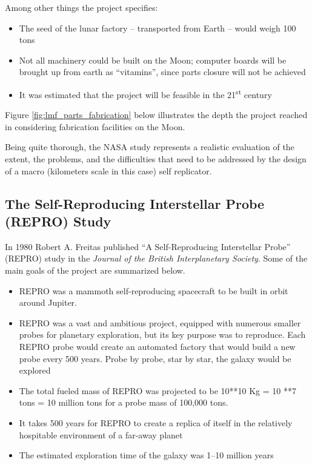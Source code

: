Among other things the project specifies:

\begin{itemize}
\item The seed of the lunar factory – transported from Earth – would
weigh 100 tons
\item Not all machinery could be built on the Moon; computer boards will
be brought up from earth as “vitamins”, since parts closure will not be
achieved
\item It was estimated that the project will be feasible in the
21\textsuperscript{st} century
\end{itemize}

Figure \ref{fig:lmf_parts_fabrication} below illustrates the depth the project reached in considering
fabrication facilities on the Moon.


Being quite thorough, the NASA study represents a realistic evaluation of
the extent, the problems, and the difficulties that need to be addressed
by the design of a macro (kilometers scale in this case) self
replicator.

\subsection[The Self{}-Reproducing Interstellar Probe (REPRO) Study]{The
Self-Reproducing Interstellar Probe (REPRO) Study}

In 1980 Robert A. Freitas
published  “A Self-Reproducing Interstellar Probe” (REPRO) study  in
the \textit{Journal of the British Interplanetary Society}. Some of the
main goals of the project are summarized below.

\begin{itemize}
\item REPRO was a mammoth self-reproducing spacecraft to be built in
orbit around Jupiter.
\item REPRO was a vast and ambitious project, equipped with numerous
smaller probes for planetary exploration, but its key purpose was to
reproduce. Each REPRO probe would create an automated factory that
would build a new probe every 500 years. Probe by probe, star by star,
the galaxy would be explored 
\item The total fueled mass of REPRO was projected to be 10**10 Kg = 10
**7 tons = 10 million tons for a probe mass of 100,000 tons.
\item It takes 500 years for REPRO to create a replica of itself in the
relatively hospitable environment of a far-away planet
\item The estimated exploration time of the galaxy was 1--10 million
years
\end{itemize}


